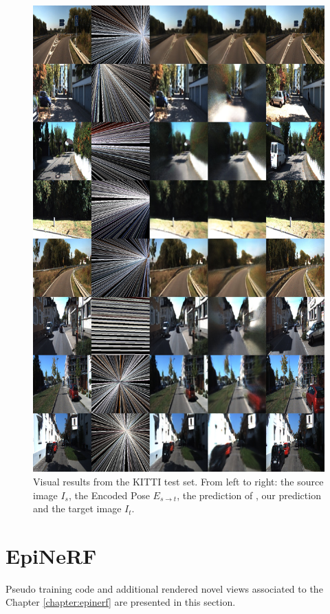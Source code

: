 \begin{figure}[htp!]
    \begin{center}
    \includegraphics[width=.9\textwidth]{images/epipolarnvs/SuppMat_KITTI.jpg}
    \end{center}
     \caption{Visual results from the KITTI \cite{KITTI} test set. From left to right: the source image  $I_s$, the Encoded Pose $E_{s\xrightarrow{}t}$,  the prediction of \cite{NVS_skip}, our prediction and the target image $I_t$.}
     \label{fig:add_visKITTI}
\end{figure}

\section{EpiNeRF}
Pseudo training code and additional rendered novel views associated to the Chapter \ref{chapter:epinerf} are presented in this section. 

